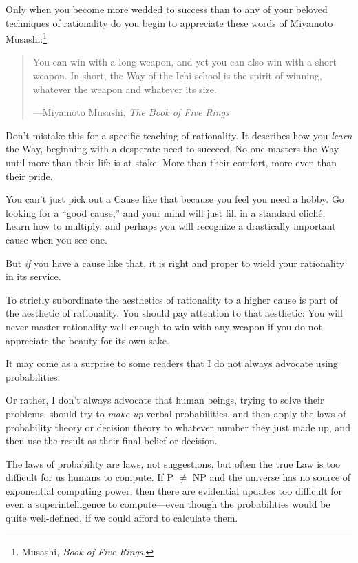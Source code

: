 {
 Only when you become more wedded to success than to any of your
beloved techniques of rationality do you begin to appreciate these
words of Miyamoto Musashi:\footnote{Musashi, \textit{Book of Five Rings}.}}

\begin{quote}
{
 You can win with a long weapon, and yet you can also win with a
short weapon. In short, the Way of the Ichi school is the spirit of
winning, whatever the weapon and whatever its size.}

{\raggedleft
 {}---Miyamoto Musashi, \textit{The Book of Five Rings}
 \par}
\end{quote}


{
 Don't mistake this for a specific teaching of
rationality. It describes how you \textit{learn} the Way, beginning
with a desperate need to succeed. No one masters the Way until more
than their life is at stake. More than their comfort, more even than
their pride.}

{
 You can't just pick out a Cause like that because
you feel you need a hobby. Go looking for a ``good
cause,'' and your mind will just fill in a standard
cliché. Learn how to multiply, and perhaps you will recognize a
drastically important cause when you see one.}

{
 But \textit{if} you have a cause like that, it is right and proper
to wield your rationality in its service.}

{
 To strictly subordinate the aesthetics of rationality to a higher
cause is part of the aesthetic of rationality. You should pay attention
to that aesthetic: You will never master rationality well enough to win
with any weapon if you do not appreciate the beauty for its own sake.}

\myendsectiontext


\bigskip


{
 It may come as a surprise to some readers that I do not always
advocate using probabilities. }

{
 Or rather, I don't always advocate that human
beings, trying to solve their problems, should try to \textit{make up}
verbal probabilities, and then apply the laws of probability theory or
decision theory to whatever number they just made up, and then use the
result as their final belief or decision.}

{
 The laws of probability are laws, not suggestions, but often the
true Law is too difficult for us humans to compute. If \textsf{P} ${\neq}$ \textsf{NP}
and the universe has no source of exponential computing power, then
there are evidential updates too difficult for even a superintelligence
to compute---even though the probabilities would be quite well-defined,
if we could afford to calculate them.}

